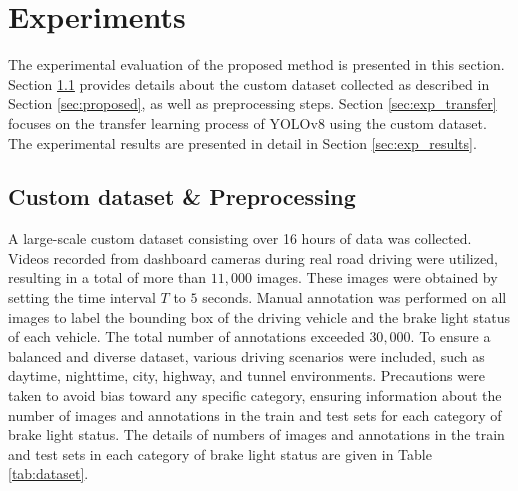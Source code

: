 \section{Experiments}
\label{sec:experiments}

The experimental evaluation of the proposed method is presented in this section. 
Section \ref{sec:exp_pre} provides details about the custom dataset collected as described in Section \ref{sec:proposed}, as well as preprocessing steps.
Section \ref{sec:exp_transfer} focuses on the transfer learning process of YOLOv8 using the custom dataset.
The experimental results are presented in detail in Section \ref{sec:exp_results}.

\subsection{Custom dataset \& Preprocessing}
\label{sec:exp_pre}
A large-scale custom dataset consisting over 16 hours of data was collected. 
Videos recorded from dashboard cameras during real road driving were utilized, resulting in a total of more than $11,000$ images.
These images were obtained by setting the time interval $T$ to $5$ seconds.
Manual annotation was performed on all images to label the bounding box of the driving vehicle and the brake light status of each vehicle.
The total number of annotations exceeded $30,000$.
To ensure a balanced and diverse dataset, various driving scenarios were included, such as daytime, nighttime, city, highway, and tunnel environments.
Precautions were taken to avoid bias toward any specific category, ensuring information about the number of images and annotations in the train and test sets for each category of brake light status.
The details of numbers of images and annotations in the train and test sets in each category of brake light status are given in Table \ref{tab:dataset}.

